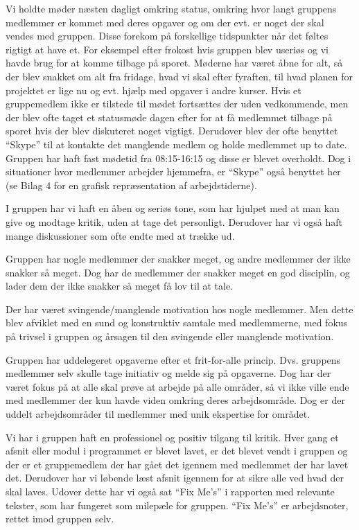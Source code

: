 \documentclass[a4paper,12pt,oneside]{article}
\begin{document}
Vi holdte møder næsten dagligt omkring status, omkring hvor langt gruppens medlemmer er kommet med deres opgaver og om der evt. er noget der skal vendes med gruppen. Disse forekom på forskellige tidspunkter når det føltes rigtigt at have et. For eksempel efter frokost hvis gruppen blev useriøs og vi havde brug for at komme tilbage på sporet. Møderne har været åbne for alt, så der blev snakket om alt fra fridage, hvad vi skal efter fyraften, til hvad planen for projektet er lige nu og evt. hjælp med opgaver i andre kurser. Hvis et gruppemedlem ikke er tilstede til mødet fortsættes der uden vedkommende, men der blev ofte taget et statusmøde dagen efter for at få medlemmet tilbage på sporet hvis der blev diskuteret noget vigtigt. Derudover blev der ofte benyttet \enquote{Skype} til at kontakte det manglende medlem og holde medlemmet up to date. Gruppen har haft fast mødetid fra 08:15-16:15 og disse er blevet overholdt. Dog i situationer hvor medlemmer arbejder hjemmefra, er \enquote{Skype} også benyttet her (se Bilag 4 for en grafisk repræsentation af arbejdstiderne).

I gruppen har vi haft en åben og seriøs tone, som har hjulpet med at man kan give og modtage kritik, uden at tage det personligt. Derudover har vi også haft mange diskussioner som ofte endte med at trække ud.

Gruppen har nogle medlemmer der snakker meget, og andre medlemmer der ikke snakker så meget. Dog har de medlemmer der snakker meget en god disciplin, og lader dem der ikke snakker så meget få lov til at tale.

Der har været svingende/manglende motivation hos nogle medlemmer. Men dette blev afviklet med en sund og konstruktiv samtale med medlemmerne, med fokus på trivsel i gruppen og årsagen til den svingende eller manglende motivation.

Gruppen har uddelegeret opgaverne efter et frit-for-alle princip. Dvs. gruppens medlemmer selv skulle tage initiativ og melde sig på opgaverne. Dog har der været fokus på at alle skal prøve at arbejde på alle områder, så vi ikke ville ende med medlemmer der kun havde viden omkring deres arbejdsområde. Dog er der uddelt arbejdsområder til medlemmer med unik ekspertise for området.

Vi har i gruppen haft en professionel og positiv tilgang til kritik. Hver gang et afsnit eller modul i programmet er blevet lavet, er det blevet vendt i gruppen og der er et gruppemedlem der har gået det igennem med medlemmet der har lavet det. Derudover har vi løbende læst afsnit igennem for at sikre alle ved hvad der skal laves. Udover dette har vi også sat \enquote{Fix Me’s} i rapporten med relevante tekster, som har fungeret som milepæle for gruppen. \enquote{Fix Me’s} er arbejdsnoter, rettet imod gruppen selv.
\end{document}

